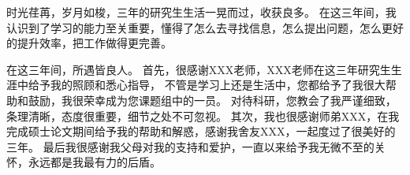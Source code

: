 \begin{acknowledgements}
时光荏苒，岁月如梭，三年的研究生生活一晃而过，收获良多。
在这三年间，我认识到了学习的能力至关重要，懂得了怎么去寻找信息，怎么提出问题，怎么更好的提升效率，把工作做得更完善。

在这三年间，所遇皆良人。
首先，很感谢XXX老师，XXX老师在这三年研究生生涯中给予我的照顾和悉心指导，
不管是学习上还是生活中，您都给予了我很大帮助和鼓励，我很荣幸成为您课题组中的一员。
对待科研，您教会了我严谨细致，条理清晰，态度很重要，细节之处不可忽视。
其次，我也很感谢师弟XXX，在我完成硕士论文期间给予我的帮助和解惑，感谢我舍友XXX，一起度过了很美好的三年。
最后我很感谢我父母对我的支持和爱护，一直以来给予我无微不至的关怀，永远都是我最有力的后盾。
\end{acknowledgements}
